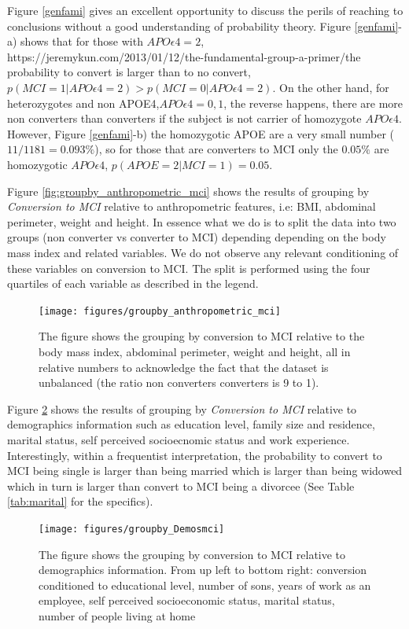 \documentclass[11pt]{article}
\theoremstyle{definition}
\theoremstyle{remark}
\begin{document}
Figure \ref{genfami} gives an excellent opportunity to discuss the perils of reaching to conclusions without a good understanding of probability theory. 
Figure \ref{genfami}-a) shows that for those with $APO\epsilon4=2$, https://jeremykun.com/2013/01/12/the-fundamental-group-a-primer/the probability to convert is larger than to no convert,$p(MCI=1|APO\epsilon4=2) > p(MCI=0|APO\epsilon4=2)$. On the other hand, for heterozygotes and non APOE4,$APO\epsilon4=0,1$, the reverse happens, there are more non converters than converters if the subject is not carrier of homozygote $APO\epsilon4$. 
However, Figure \ref{genfami}-b) the homozygotic APOE are a very small number ($11/1181 = 0.093\%$), so for those that are converters to MCI only the $0.05\%$ are homozygotic $APO\epsilon4$, $p(APOE=2|MCI=1)=0.05$.

Figure \ref{fig:groupby_anthropometric_mci} shows the results of grouping by \emph{Conversion to MCI} relative to anthropometric features, i.e: BMI, abdominal perimeter, weight and height. In essence what we do is to split the data into two groups (non converter vs converter to MCI) depending depending on the body mass index and related variables. We do not observe any relevant conditioning of these variables on conversion to MCI. The split is performed using the four quartiles of each variable as described in the legend.

\begin{figure}[H]
        \centering
        \texttt{[image: figures/groupby\_anthropometric\_mci]}
        \caption{The figure shows the grouping by conversion to MCI relative to the body mass index, abdominal perimeter, weight and height, all in relative numbers to acknowledge the fact that the dataset is unbalanced (the ratio non converters converters is 9 to 1). } 
        \label{fig:groupby_genetics_mci}
\end{figure}

Figure \ref{fig:groupby_Demosmci} shows the results of grouping by \emph{Conversion to MCI} relative to demographics information such as education level, family size and residence, marital status, self perceived socioecnomic status and work experience. Interestingly, within a frequentist interpretation, the probability to convert to MCI being single is larger than being married which is larger than being widowed which in turn is larger than convert to MCI being a divorcee (See Table \ref{tab:marital} for the specifics). 

\begin{figure}[H]
        \centering
        \texttt{[image: figures/groupby\_Demosmci]}
        \caption{The figure shows the grouping by conversion to MCI relative to demographics information. From up left to bottom right: conversion conditioned to educational level, number of sons, years of work as an employee, self perceived socioeconomic status, marital status, number of people living at home } 
        \label{fig:groupby_Demosmci}
\end{figure}
\end{document}
